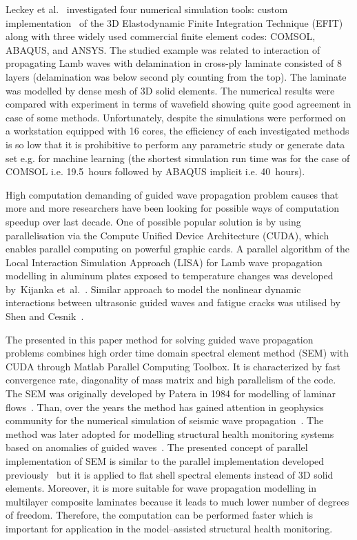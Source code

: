 \documentclass[preprint,12pt]{elsarticle}
\begin{document}
	Leckey et al.~\cite{Leckey2018} investigated four numerical simulation tools: custom implementation~\cite{Leckey2014} of the 3D Elastodynamic Finite Integration Technique (EFIT) \cite{Schubert1998} along with three widely used commercial finite element codes: COMSOL, ABAQUS, and ANSYS. The studied example was related to interaction of propagating Lamb waves with delamination in cross-ply laminate consisted of 8 layers (delamination was below second ply counting from the top). The laminate was modelled by dense mesh of 3D solid elements. The numerical results were compared with experiment in terms of wavefield showing quite good agreement in case of some methods. Unfortunately, despite the simulations were performed on a workstation equipped with 16 cores, the efficiency of each investigated methods is so low that it is prohibitive to perform any parametric study or generate data set e.g. for machine learning (the shortest simulation run time was for the case of COMSOL i.e. 19.5~hours followed by ABAQUS implicit i.e. 40~hours).
	
	High computation demanding of guided wave propagation problem causes that more and more researchers have been looking for possible ways of computation speedup over last decade. One of possible popular solution is by using parallelisation via the Compute Unified Device Architecture (CUDA), which enables parallel computing on powerful graphic cards. A parallel algorithm of the Local Interaction Simulation Approach (LISA) for Lamb wave propagation modelling in aluminum plates exposed to temperature changes was developed by~Kijanka et~al.~\cite{Kijanka2013}. Similar approach to model the nonlinear dynamic interactions between ultrasonic guided waves and fatigue cracks was utilised by Shen and Cesnik~\cite{Shen2017}.  
	
	The presented in this paper method for solving guided wave propagation problems combines high order time domain spectral element method (SEM) with CUDA through Matlab Parallel Computing Toolbox. It is characterized by fast convergence rate, diagonality of mass matrix and high parallelism of the code. The SEM was originally developed by Patera in 1984 for modelling of laminar flows~\cite{Patera1984}. Than, over the years the method has gained attention in geophysics community for the numerical simulation of seismic wave propagation~\cite{Seriani1998,Komatitsch2009}. The method was later adopted for modelling structural health monitoring systems based on anomalies of guided waves~\cite{Ostachowicz2012,Lonkar2013}. The presented concept of parallel implementation of SEM is similar to the parallel implementation developed previously~\cite{Kudela2016} but it is applied to flat shell spectral elements instead of 3D solid elements. Moreover, it is more suitable for wave propagation modelling in multilayer composite laminates because it leads to much lower number of degrees of freedom. Therefore, the computation can be performed faster which is important for application in the model--assisted structural health monitoring.
	
\end{document}
